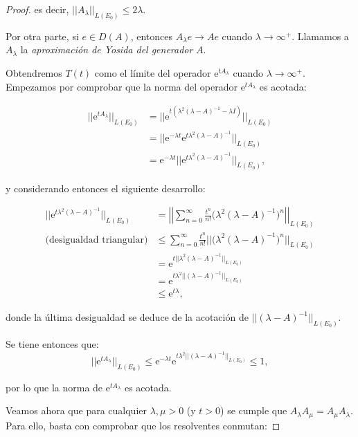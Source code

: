 \begin{proof}
    es decir, $||A_\lambda||_{L(E_0)} \leq 2\lambda$.

    Por otra parte, si $e \in D(A)$, entonces $A_\lambda e \rightarrow Ae$ cuando $\lambda \rightarrow \infty^+$. Llamamos a $A_\lambda$ la \textit{aproximación de Yosida del generador} $A$.

    Obtendremos $T(t)$ como el límite del operador $\mathrm{e}^{tA_\lambda}$ cuando $\lambda \rightarrow \infty^+$. Empezamos por comprobar que la norma del operador $\mathrm{e}^{tA_\lambda}$ es acotada:

    \begin{align*}
        ||\mathrm{e}^{tA_\lambda}||_{L(E_0)} &= ||\mathrm{e}^{t(\lambda^2(\lambda - A)^{-1} - \lambda I)}||_{L(E_0)}\\
        &=||\mathrm{e}^{-\lambda t}\mathrm{e}^{t\lambda^2(\lambda - A)^{-1}}||_{L(E_0)}\\
        &=\mathrm{e}^{-\lambda t} ||\mathrm{e}^{t\lambda^2(\lambda - A)^{-1}}||_{L(E_0)},
    \end{align*}

    y considerando entonces el siguiente desarrollo:

    \begin{align*}
        ||\mathrm{e}^{t\lambda^2(\lambda - A)^{-1}}||_{L(E_0)} &= \left | \left |\sum_{n=0}^\infty \frac{t^n}{n!}\big(\lambda^2(\lambda - A)^{-1}\big)^n \right | \right |_{L(E_0)}\\
        \text{(desigualdad triangular)} &\leq \sum_{n=0}^\infty \frac{t^n}{n!}\Big | \Big |\big(\lambda^2(\lambda - A)^{-1}\big)^n \Big | \Big |_{L(E_0)}\\
        &=\mathrm{e}^{t ||\lambda^2 (\lambda - A)^{-1}||_{L(E_0)}}\\
        &=\mathrm{e}^{t\lambda^2 ||(\lambda - A)^{-1}||_{L(E_0)}}\\
        &\leq \mathrm{e}^{t\lambda},
    \end{align*}

    donde la última desigualdad se deduce de la acotación de $||(\lambda -A)^{-1}||_{L(E_0)}$.

    Se tiene entonces que:
    \[||\mathrm{e}^{tA_\lambda}||_{L(E_0)} \leq \mathrm{e}^{-\lambda t}\mathrm{e}^{t\lambda^2 ||(\lambda - A)^{-1}||_{L(E_0)}} \leq 1,\]

    por lo que la norma de $\mathrm{e}^{tA_\lambda}$ es acotada.

    Veamos ahora que para cualquier $\lambda, \mu > 0$ (y $t > 0$) se cumple que $A_\lambda A_\mu = A_\mu A_\lambda$. Para ello, basta con comprobar que los resolventes conmutan:


\end{proof}
